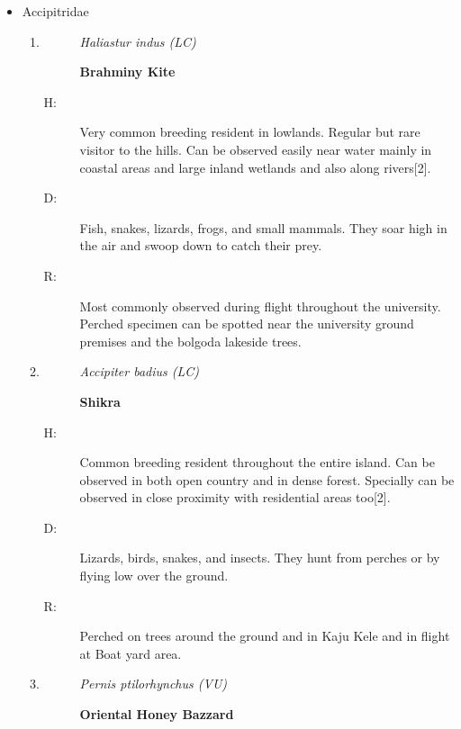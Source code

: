 \begin{itemize}%
\item%
 Accipitridae%
\begin{enumerate}%
\item%
\begin{description}%
\item[]%
\textit{Haliastur indus (LC)}%
\item[]%
\textbf{Brahminy Kite}%
\end{description}%
\begin{description}%
\item[H: ]%
Very common breeding resident in lowlands. Regular but rare visitor to the hills. Can be observed easily near water mainly in coastal areas and large inland wetlands and also along rivers{[}2{]}.%
\item[D: ]%
Fish, snakes, lizards, frogs, and small mammals. They soar high in the air and swoop down to catch their prey.%
\item[R: ]%
Most commonly observed during flight throughout the university. Perched specimen can be spotted near the university ground premises and the bolgoda lakeside trees.%
\end{description}%
\item%
\begin{description}%
\item[]%
\textit{Accipiter badius (LC)}%
\item[]%
\textbf{Shikra}%
\end{description}%
\begin{description}%
\item[H: ]%
Common breeding resident throughout the entire island. Can be observed in both open country and in dense forest. Specially can be observed in close proximity with residential areas too{[}2{]}.%
\item[D: ]%
 Lizards, birds, snakes, and insects. They hunt from perches or by flying low over the ground.%
\item[R: ]%
Perched on trees around the ground and in Kaju Kele and in flight at Boat yard area.%
\end{description}%
\item%
\begin{description}%
\item[]%
\textit{Pernis ptilorhynchus (VU)}%
\item[]%
\textbf{Oriental Honey Bazzard}%
\end{description}%
\begin{description}%

\end{description}
\end{enumerate}
\end{itemize}
